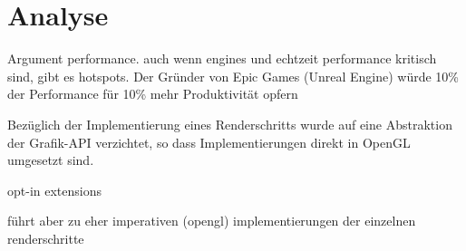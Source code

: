 \chapter{Analyse}
\label{chap:analyse}
Argument performance. auch wenn engines und echtzeit performance kritisch sind, gibt es hotspots.
Der Gründer von Epic Games (Unreal Engine) würde 10\% der Performance für 10\% mehr Produktivität opfern \parencite[Seite 20]{Sweeney2006} %

Bezüglich der Implementierung eines Renderschritts wurde auf eine Abstraktion der Grafik-API verzichtet, so dass Implementierungen direkt in OpenGL umgesetzt sind.

opt-in extensions

führt aber zu eher imperativen (opengl) implementierungen der einzelnen renderschritte
